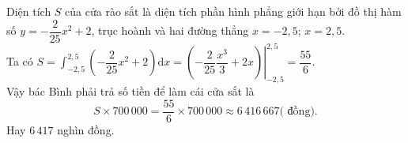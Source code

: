 \begin{bt}
{		Diện tích $S$ của cửa rào sắt là diện tích phần hình phẳng giới hạn bởi đồ thị hàm số $y=-\dfrac{2}{25} x^{2}+2$, trục hoành và hai đường thẳng $x=-2{,}5$; $x=2{,}5$.\\
		Ta có $S=\displaystyle\int_{-2{,}5}^{2{,}5}\left(-\dfrac{2}{25} x^{2}+2\right) \mathrm{d} x=\left.\left(-\dfrac{2}{25} \dfrac{x^{3}}{3}+2 x\right)\right|_{-2{,}5} ^{2{,}5}=\dfrac{55}{6}$.\\
		Vậy bác Bình phải trả số tiền để làm cái cửa sắt là
		$$S \times 700\,000=\dfrac{55}{6} \times 700\,000 \approx 6\,416 \,667 \text{( đồng).}$$ 
		Hay $6\,417$ nghìn đồng.
	}
\end{bt}

\begin{bt}%


\end{bt}
